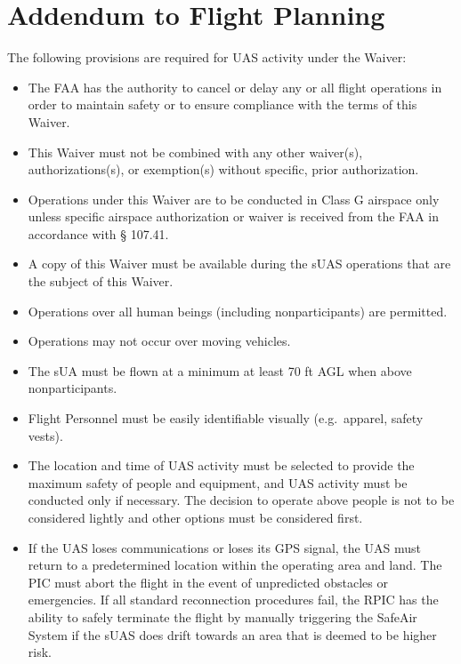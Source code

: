 \documentclass[
]{book}
\providecommand{\tightlist}{%
  \setlength{\itemsep}{0pt}\setlength{\parskip}{0pt}}
\begin{document}
\hypertarget{s39p-fp}{%
\section{Addendum to Flight Planning}\label{s39p-fp}}

The following provisions are required for UAS activity under the Waiver:

\begin{itemize}
\tightlist
\item
  The FAA has the authority to cancel or delay any or all flight operations in order to maintain safety or to ensure compliance with the terms of this Waiver.
\item
  This Waiver must not be combined with any other waiver(s), authorizations(s), or exemption(s) without specific, prior authorization.
\item
  Operations under this Waiver are to be conducted in Class G airspace only unless specific airspace authorization or waiver is received from the FAA in accordance with § 107.41.
\item
  A copy of this Waiver must be available during the sUAS operations that are the subject of this Waiver.
\item
  Operations over all human beings (including nonparticipants) are permitted.
\item
  Operations may not occur over moving vehicles.
\item
  The sUA must be flown at a minimum at least 70 ft AGL when above nonparticipants.
\item
  Flight Personnel must be easily identifiable visually (e.g.~apparel, safety vests).
\item
  The location and time of UAS activity must be selected to provide the maximum safety of people and equipment, and UAS activity must be conducted only if necessary. The decision to operate above people is not to be considered lightly and other options must be considered first.
\item
  If the UAS loses communications or loses its GPS signal, the UAS must return to a predetermined location within the operating area and land. The PIC must abort the flight in the event of unpredicted obstacles or emergencies. If all standard reconnection procedures fail, the RPIC has the ability to safely terminate the flight by manually triggering the SafeAir System if the sUAS does drift towards an area that is deemed to be higher risk.
\end{itemize}
\end{document}

